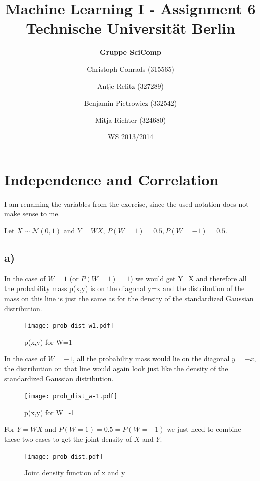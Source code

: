 \documentclass[paper=a4,fontsize=10pt,DIV11,BCOR10mm]{scrartcl}
\begin{document}
\title{Machine Learning I - Assignment 6\\
\small{Technische Universität Berlin}}


\author{\hspace{5cm}\textbf{Gruppe SciComp}\hspace{5cm} \and
	\small{Christoph Conrads (315565)} \and
	\small{Antje Relitz (327289)} \and
	\small{Benjamin Pietrowicz (332542)} \and
	\small{Mitja Richter (324680)}
}

\date{WS 2013/2014}

\maketitle


\section{Independence and Correlation}

I am renaming the variables from the exercise, since the used notation does not make sense to me.

Let $X\sim\mathcal{N}(0,1)$ and $Y=WX$, $P(W=1)=0.5, P(W=-1)=0.5$.

\subsection*{a)}
In the case of $W=1$ (or $P(W=1)=1$) we would get Y=X and therefore all the probability mass p(x,y) is on the diagonal y=x and the distribution of the mass on this line is just the same as for the density of the standardized Gaussian distribution.
\begin{figure}[htb]
\texttt{[image: prob\_dist\_w1.pdf]}
\caption{p(x,y) for W=1}
\end{figure}
\FloatBarrier

In the case of $W=-1$, all the probability mass would lie on the diagonal $y=-x$, the distribution on that line  would again look just like the density of the standardized Gaussian distribution.
\begin{figure}[htb]
\texttt{[image: prob\_dist\_w-1.pdf]}
\caption{p(x,y) for W=-1}
\end{figure}
\FloatBarrier
For $Y=WX$ and $P(W=1)=0.5=P(W=-1)$ we just need to combine these two cases to get the joint density of $X$ and $Y$.
\begin{figure}[htb]
\texttt{[image: prob\_dist.pdf]}
\caption{Joint density function of x and y}
\end{figure}
\FloatBarrier
\end{document}
